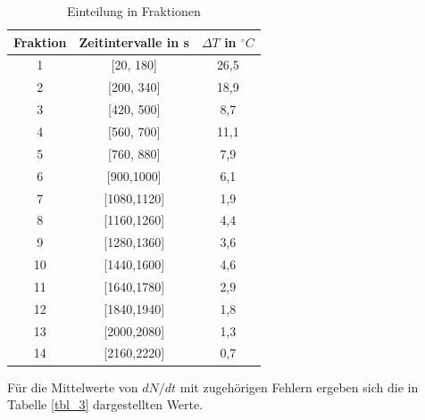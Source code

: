 \begin{table}
\centering
\begin{tabular}{ccc}

Fraktion&	Zeitintervalle in s	& $\Delta T $ in $ ^{\circ} C$ \\
\toprule
1		&[20, 180]		&26,5\\

2		&[200, 340]		&18,9\\

3		&[420, 500]		&8,7\\

4		&[560, 700]		&11,1\\

5		&[760, 880]		&7,9\\

6		&[900,1000]		&6,1\\

7		&[1080,1120]		&1,9\\

8		&[1160,1260]		&4,4\\

9		&[1280,1360]		&3,6\\

10		&[1440,1600]		&4,6\\

11		&[1640,1780]		&2,9\\

12		&[1840,1940]		&1,8\\

13		&[2000,2080]		&1,3\\

14		&[2160,2220]		&0,7\\

\end{tabular}

\caption{Einteilung in Fraktionen}
\label{tbl_2}
\end{table}



Für die Mittelwerte von $dN/dt$ mit zugehörigen Fehlern ergeben sich die in Tabelle \ref{tbl_3} dargestellten Werte.

